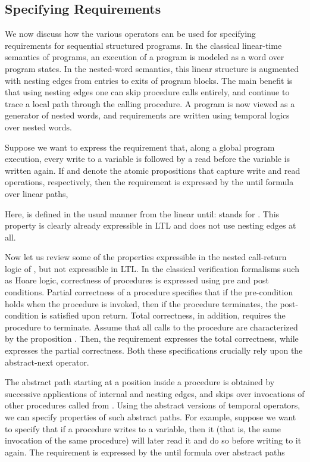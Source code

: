 \documentclass{LMCS}
\theoremstyle{plain}
\theoremstyle{definition}
\newcommand{\caret}{\text{CaRet}}
\newcounter{example}
\begin{document}
\subsection{Specifying Requirements}
We now discuss how the various operators can be used for
specifying requirements for sequential structured programs.
In the classical linear-time semantics of programs,
an execution of a program is modeled as a word over program states.
In the nested-word semantics, this linear structure 
is augmented with nesting edges from
entries to exits of program blocks.
The main benefit is that using nesting edges one can 
skip procedure calls entirely, and continue to
trace a local path through the calling procedure.
A program is now viewed as a generator of nested words,
and requirements are written using temporal logics over nested words.

Suppose we want to express the requirement that, along a global
program execution, every write to a variable is followed by a read
before the variable is written again.  If  and  denote the
atomic propositions that capture write and read operations,
respectively, then the requirement is expressed by the until formula
over linear paths,

  Here,  is defined in the usual manner from the linear
until:  stands for .  This
property is clearly already expressible in LTL and does not use nesting
edges at all.

Now let us review some of the properties expressible in the nested
call-return logic \caret{} of \cite{AEM04}, but
not expressible in LTL.  In the classical verification
formalisms such as Hoare logic, correctness of procedures is expressed
using pre and post conditions.  Partial correctness of a procedure 
specifies that if the pre-condition  holds when the procedure 
is invoked, then if the procedure terminates, the post-condition 
is satisfied upon return. Total correctness, in addition, requires the
procedure to terminate.  Assume that all calls to the procedure 
are characterized by the proposition . Then, the requirement
 expresses the total correctness, while  expresses the
partial correctness.  Both these specifications crucially rely upon
the abstract-next operator.

The abstract path starting at a position inside a procedure  is
obtained by successive applications of internal and nesting edges,
 and skips over invocations of
other procedures called from . 
Using the abstract versions of temporal operators, we 
 can specify properties of such
abstract paths. For example, suppose we want to specify that
if a procedure writes to a variable, then it (that is, the same 
invocation of the same procedure) will later read it and do so before writing to it again.
The requirement is expressed by the
until formula over abstract paths
\end{document}
